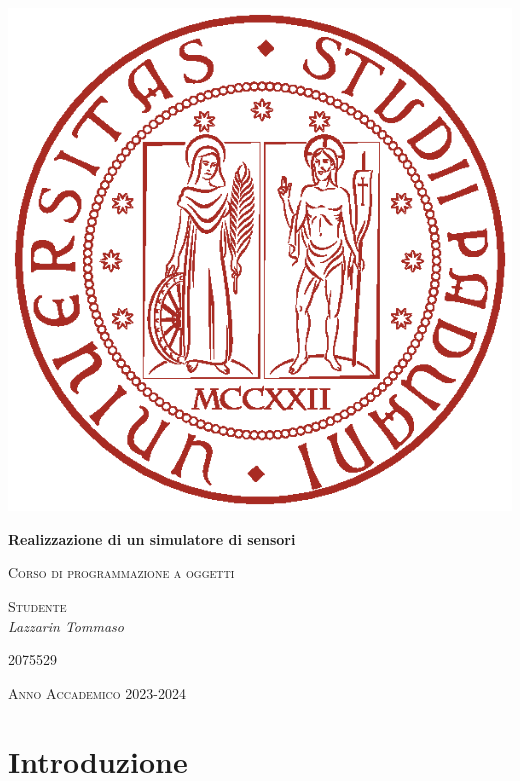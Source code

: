 \documentclass[a4paper]{article}
\begin{document}
\begin{titlepage}
    \centering
    \includegraphics{img/universita-degli-studi-di-padova.eps}
    {\huge\bfseries Realizzazione di un simulatore di sensori\par}
    \vspace{0.5cm}
    {\scshape\Large Corso di programmazione a oggetti\par}
    \vspace{1.5cm}
    {\raggedright \textsc{Studente} \\ \Large\itshape Lazzarin Tommaso\par}
    \vspace{0.1cm}
    {\raggedright\textsc{2075529}\par}
    \vfill
    {\large \textsc{Anno Accademico 2023-2024}}
\end{titlepage}
\clearpage
\tableofcontents
\clearpage
\section{Introduzione}
\end{document}
